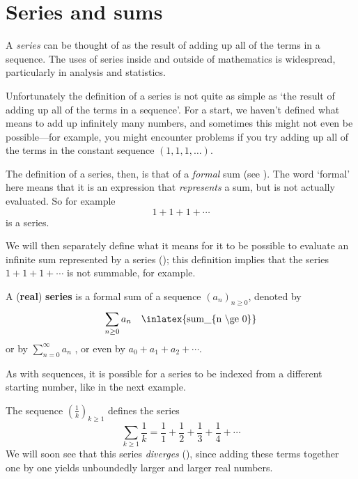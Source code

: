 \section{Series and sums}

A \textit{series} can be thought of as the result of adding up all of the terms in a sequence. The uses of series inside and outside of mathematics is widespread, particularly in analysis and statistics.

Unfortunately the definition of a series is not quite as simple as `the result of adding up all of the terms in a sequence'. For a start, we haven't defined what means to add up infinitely many numbers, and sometimes this might not even be possible---for example, you might encounter problems if you try adding up all of the terms in the constant sequence $(1,1,1,\dots)$.

The definition of a series, then, is that of a \textit{formal} sum (see ). The word `formal' here means that it is an expression that \textit{represents} a sum, but is not actually evaluated. So for example
\[ 1 + 1 + 1 + \cdots \]
is a series.

We will then separately define what it means for it to be possible to evaluate an infinite sum represented by a series (); this definition implies that the series $1+1+1+\cdots$ is not summable, for example.

\begin{definition}
\label{defSeries}
A (\textbf{real}) \textbf{series} is a formal sum of a sequence $(a_n)_{n \ge 0}$, denoted by
\[ \sum_{n \ge 0} a_n \quad \text{\inlatex{sum\_\{n \textbackslash{}ge 0\}}} \]
or by $\displaystyle \sum_{n=0}^{\infty} a_n$ , or even by $a_0 + a_1 + a_2 + \cdots$.
\end{definition}

As with sequences, it is possible for a series to be indexed from a different starting number, like in the next example.

\begin{example}
The sequence $(\frac{1}{k})_{k \ge 1}$ defines the series
\[ \sum_{k \ge 1} \dfrac{1}{k} = \dfrac{1}{1} + \dfrac{1}{2} + \dfrac{1}{3} + \dfrac{1}{4} + \cdots \]
We will soon see that this series \textit{diverges} (), since adding these terms together one by one yields unboundedly larger and larger real numbers.
\end{example}

